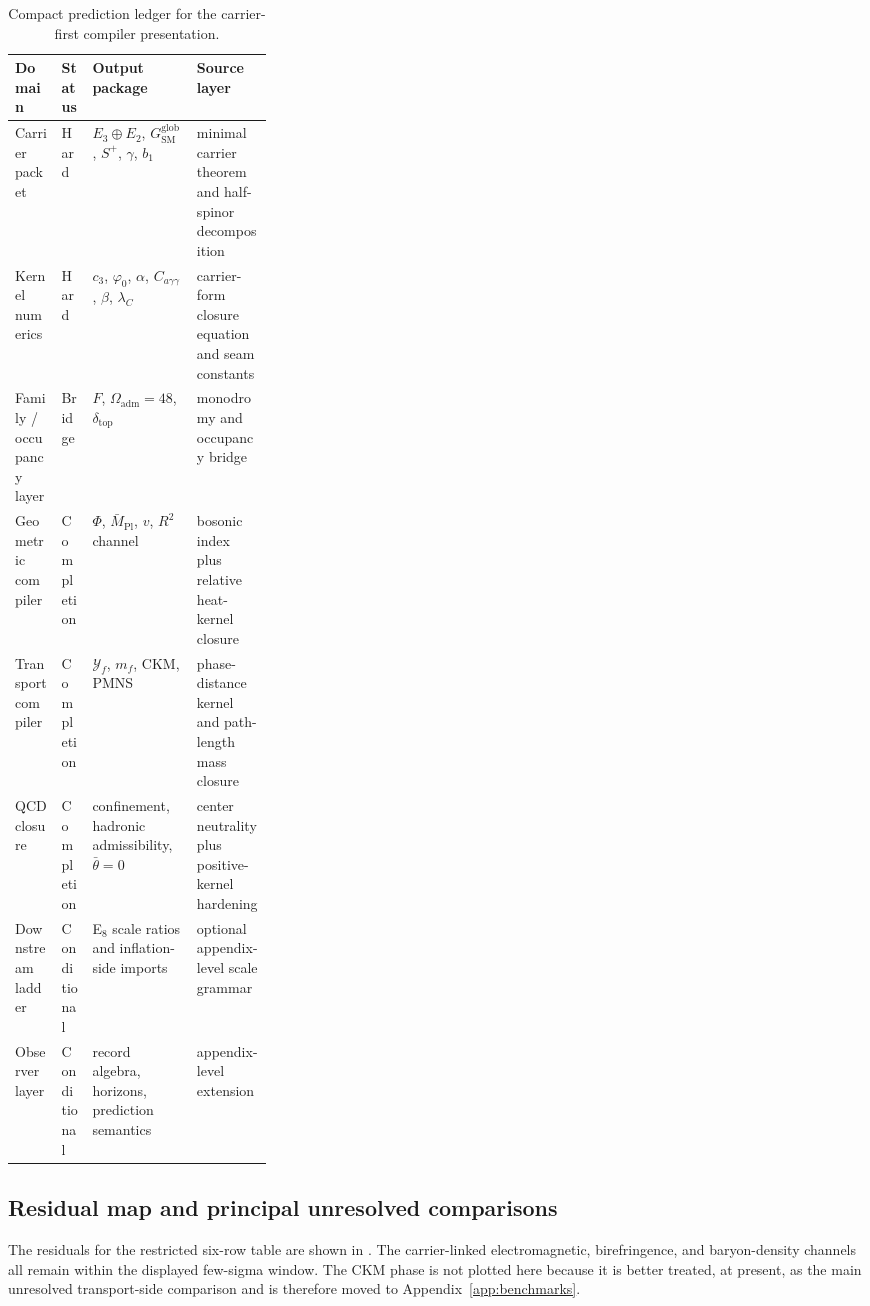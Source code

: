 \documentclass[11pt,a4paper]{article}
\theoremstyle{definition}
\theoremstyle{remark}
\newcommand{\Mpl}{\bar M_{\mathrm{Pl}}}
\newcommand{\cthree}{c_3}
\newcommand{\phiz}{\varphi_0}
\newcommand{\deltatop}{\delta_{\mathrm{top}}}
\newcommand{\bone}{b_1}
\newcommand{\SM}{\mathrm{SM}}
\newcommand{\Oadm}{\Omega_{\mathrm{adm}}}
\begin{document}
\begin{table}[t]
\centering
\small
\begin{tabularx}{\linewidth}{@{}>{\raggedright\arraybackslash}p{0.18\linewidth}>{\raggedright\arraybackslash}p{0.12\linewidth}YY@{}}
\toprule
Domain & Status & Output package & Source layer \\
\midrule
Carrier packet & Hard & $E_3\oplus E_2$, $G_{\SM}^{\mathrm{glob}}$, $S^+$, $\gamma$, $\bone$ & minimal carrier theorem and half-spinor decomposition \\
Kernel numerics & Hard & $\cthree$, $\phiz$, $\alpha$, $C_{a\gamma\gamma}$, $\beta$, $\lambda_C$ & carrier-form closure equation and seam constants \\
Family / occupancy layer & Bridge & $F$, $\Oadm=48$, $\deltatop$ & monodromy and occupancy bridge \\
Geometric compiler & Completion & $\Phi$, $\Mpl$, $v$, $R^2$ channel & bosonic index plus relative heat-kernel closure \\
Transport compiler & Completion & $\mathcal Y_f$, $m_f$, CKM, PMNS & phase-distance kernel and path-length mass closure \\
QCD closure & Completion & confinement, hadronic admissibility, $\bar\theta=0$ & center neutrality plus positive-kernel hardening \\
Downstream ladder & Conditional & E$_8$ scale ratios and inflation-side imports & optional appendix-level scale grammar \\
Observer layer & Conditional & record algebra, horizons, prediction semantics & appendix-level extension \\
\bottomrule
\end{tabularx}
\caption{Compact prediction ledger for the carrier-first compiler presentation.}
\label{tab:prediction-ledger}
\end{table}

\subsection{Residual map and principal unresolved comparisons}

The residuals for the restricted six-row table are shown in . The carrier-linked electromagnetic, birefringence, and baryon-density channels all remain within the displayed few-sigma window. The CKM phase is not plotted here because it is better treated, at present, as the main unresolved transport-side comparison and is therefore moved to Appendix~\ref{app:benchmarks}.
\end{document}
